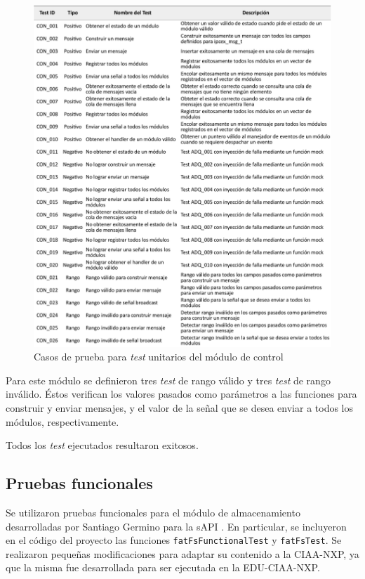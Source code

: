 \begin{figure}[!htpb]
	\centering
	\includegraphics[width=\textwidth]{./Figures/TestCON.pdf}
	\caption{Casos de prueba para \textit{test} unitarios del módulo de control}
	\label{fig:test_control}
\end{figure}

Para este módulo se definieron tres \textit{test} de rango válido y tres \textit{test} de rango inválido. Éstos verifican los valores pasados como parámetros a las funciones para construir y enviar mensajes, y el valor de la señal que se desea enviar a todos los módulos, respectivamente.

Todos los \textit{test} ejecutados resultaron exitosos.

\subsection{Pruebas funcionales}
\label{subsec:pruebasFuncionales}

Se utilizaron pruebas funcionales para el módulo de almacenamiento desarrolladas por Santiago Germino para la sAPI \citep{pruebasfuncionales}.  En particular, se incluyeron en el código del proyecto las funciones \texttt{fatFsFunctionalTest} y \texttt{fatFsTest}. Se realizaron pequeñas modificaciones para adaptar su contenido a la CIAA-NXP, ya que la misma fue desarrollada para ser ejecutada en la EDU-CIAA-NXP.

